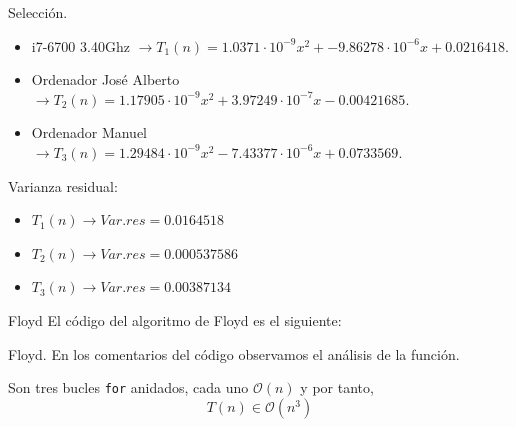 \documentclass[10pt, xcolor=table]{beamer}
\begin{document}
\begin{frame}[fragile]{Selección.
		}
	\begin{itemize}
		\item i7-6700 3.40Ghz \(\rightarrow T_1(n) = 1.0371 \cdot 10^{-9} x^2 + -9.86278 \cdot 10^{-6} x +0.0216418\).
		\item Ordenador José Alberto \(\rightarrow T_2(n) = 1.17905 \cdot 10^{-9} x^2 + 3.97249 \cdot 10^{-7} x - 0.00421685\).
		\item Ordenador Manuel \(\rightarrow T_3(n) = 1.29484 \cdot 10^{-9} x^2 - 7.43377 \cdot 10^{-6} x + 0.0733569\).
	\end{itemize}
	
	Varianza residual:
	\begin{itemize}
		\item \(T_1(n) \longrightarrow Var.res = 0.0164518\)
		\item \(T_2(n) \longrightarrow Var.res = 0.000537586\)
		\item \(T_3(n) \longrightarrow Var.res = 0.00387134\)
	\end{itemize}
\end{frame}

\begin{frame}[fragile]{Floyd}
El código del algoritmo de Floyd es el siguiente:

\end{frame}

\begin{frame}[fragile]{Floyd.
}
En los comentarios del código observamos el análisis de la función.

Son tres bucles \texttt{for} anidados, cada uno \(\mathcal{O}(n)\) y por tanto,
\[
	T(n) \in \mathcal{O}(n^3)
\]
\end{frame}
\end{document}
